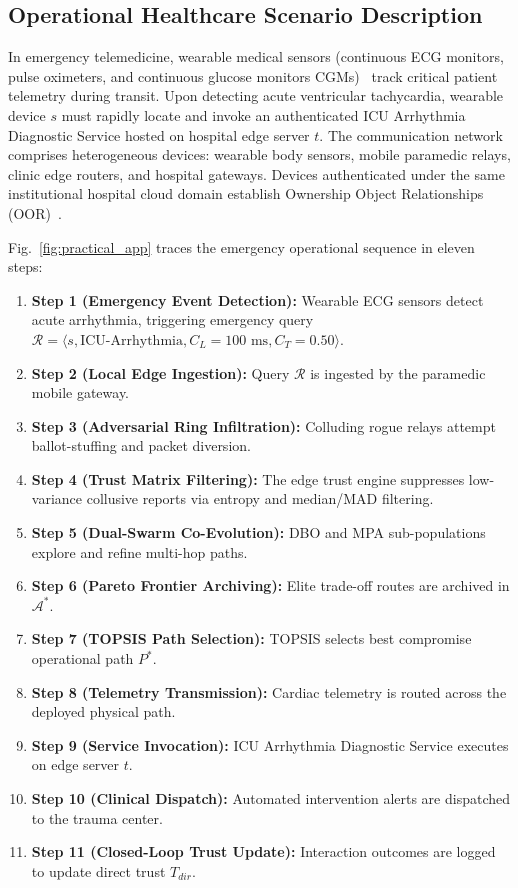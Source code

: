 \documentclass[journal,compsoc]{IEEEtran}
\begin{document}
\subsection{Operational Healthcare Scenario Description}
In emergency telemedicine, wearable medical sensors (continuous ECG monitors, pulse oximeters, and continuous glucose monitors CGMs)~\cite{javaid2021low} track critical patient telemetry during transit. Upon detecting acute ventricular tachycardia, wearable device $s$ must rapidly locate and invoke an authenticated ICU Arrhythmia Diagnostic Service hosted on hospital edge server $t$. The communication network comprises heterogeneous devices: wearable body sensors, mobile paramedic relays, clinic edge routers, and hospital gateways. Devices authenticated under the same institutional hospital cloud domain establish Ownership Object Relationships (OOR)~\cite{rad2020social}.

Fig.~\ref{fig:practical_app} traces the emergency operational sequence in eleven steps:
\begin{enumerate}
    \item \textbf{Step 1 (Emergency Event Detection):} Wearable ECG sensors detect acute arrhythmia, triggering emergency query $\mathcal{R} = \langle s, \text{ICU-Arrhythmia}, C_L = 100\text{ ms}, C_T = 0.50 \rangle$.
    \item \textbf{Step 2 (Local Edge Ingestion):} Query $\mathcal{R}$ is ingested by the paramedic mobile gateway.
    \item \textbf{Step 3 (Adversarial Ring Infiltration):} Colluding rogue relays attempt ballot-stuffing and packet diversion.
    \item \textbf{Step 4 (Trust Matrix Filtering):} The edge trust engine suppresses low-variance collusive reports via entropy and median/MAD filtering.
    \item \textbf{Step 5 (Dual-Swarm Co-Evolution):} DBO and MPA sub-populations explore and refine multi-hop paths.
    \item \textbf{Step 6 (Pareto Frontier Archiving):} Elite trade-off routes are archived in $\mathcal{A}^*$.
    \item \textbf{Step 7 (TOPSIS Path Selection):} TOPSIS selects best compromise operational path $P^*$.
    \item \textbf{Step 8 (Telemetry Transmission):} Cardiac telemetry is routed across the deployed physical path.
    \item \textbf{Step 9 (Service Invocation):} ICU Arrhythmia Diagnostic Service executes on edge server $t$.
    \item \textbf{Step 10 (Clinical Dispatch):} Automated intervention alerts are dispatched to the trauma center.
    \item \textbf{Step 11 (Closed-Loop Trust Update):} Interaction outcomes are logged to update direct trust $T_{dir}$.
\end{enumerate}
\end{document}
